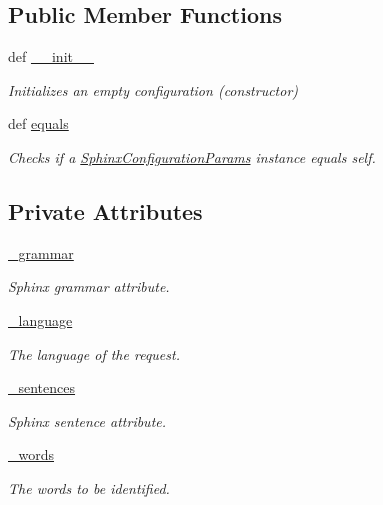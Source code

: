 \subsection*{Public Member Functions}
\begin{DoxyCompactItemize}
\item 
def \hyperlink{classrapp__speech__detection__sphinx4_1_1sphinx4__configuration__params_1_1SphinxConfigurationParams_a1a4d416054657547de8dddfa9dc2f079}{\-\_\-\-\_\-init\-\_\-\-\_\-}
\begin{DoxyCompactList}\small\item\em Initializes an empty configuration (constructor) \end{DoxyCompactList}\item 
def \hyperlink{classrapp__speech__detection__sphinx4_1_1sphinx4__configuration__params_1_1SphinxConfigurationParams_a1d4174514a206ef23357977ee5a5390e}{equals}
\begin{DoxyCompactList}\small\item\em Checks if a \hyperlink{classrapp__speech__detection__sphinx4_1_1sphinx4__configuration__params_1_1SphinxConfigurationParams}{Sphinx\-Configuration\-Params} instance equals self. \end{DoxyCompactList}\end{DoxyCompactItemize}
\subsection*{Private Attributes}
\begin{DoxyCompactItemize}
\item 
\hyperlink{classrapp__speech__detection__sphinx4_1_1sphinx4__configuration__params_1_1SphinxConfigurationParams_a38df1b7d3f1b19f3fb335ccf1a7e181d}{\-\_\-grammar}
\begin{DoxyCompactList}\small\item\em Sphinx grammar attribute. \end{DoxyCompactList}\item 
\hyperlink{classrapp__speech__detection__sphinx4_1_1sphinx4__configuration__params_1_1SphinxConfigurationParams_a56cc14a8b1f9f7369f5fcd41b892830f}{\-\_\-language}
\begin{DoxyCompactList}\small\item\em The language of the request. \end{DoxyCompactList}\item 
\hyperlink{classrapp__speech__detection__sphinx4_1_1sphinx4__configuration__params_1_1SphinxConfigurationParams_aae72d0d46abac2ff13fe9d6d94e34fdf}{\-\_\-sentences}
\begin{DoxyCompactList}\small\item\em Sphinx sentence attribute. \end{DoxyCompactList}\item 
\hyperlink{classrapp__speech__detection__sphinx4_1_1sphinx4__configuration__params_1_1SphinxConfigurationParams_a668f07761930a1858db80c5711f3c84d}{\-\_\-words}
\begin{DoxyCompactList}\small\item\em The words to be identified. \end{DoxyCompactList}\end{DoxyCompactItemize}


